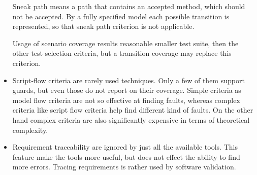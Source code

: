 \begin{itemize}
	Sneak path means a path that contains an accepted method, which should not be accepted. By a fully specified model each possible transition is represented, so that sneak path criterion is not applicable.
	
	Usage of scenario coverage results reasonable smaller test suite, then the other test selection criteria, but a transition coverage may replace this criterion.
	\item Script-flow criteria are rarely used techniques. Only a few of them support guards, but even those do not report on their coverage. Simple criteria as model flow criteria are not so effective at finding faults, whereas complex criteria like script flow criteria help find different kind of faults. On the other hand complex criteria are also significantly expensive in terms of theoretical complexity.
	\item Requirement traceability are ignored by just all the available tools. This feature make the tools more useful, but does not effect the ability to find more errors. Tracing requirements is rather used by software validation.
\end{itemize}


